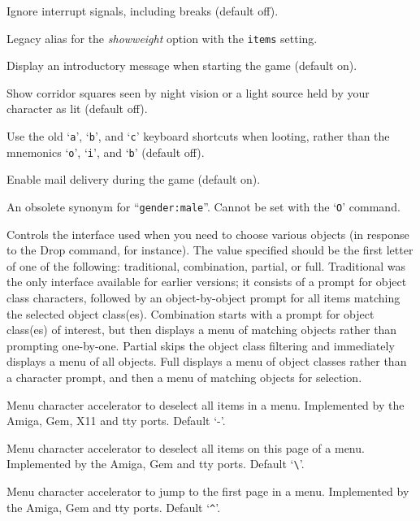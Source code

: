 \item[\ib{ignintr}]
Ignore interrupt signals, including breaks (default off).
\item[\ib{invweight}]
Legacy alias for the
{\it showweight\/}
option with the {\tt items} setting.
\item[\ib{legacy}]
Display an introductory message when starting the game (default on).
\item[\ib{lit\_corridor}]
Show corridor squares seen by night vision or a light source held by your
character as lit (default off).
\item[\ib{lootabc}]
Use the old `{\tt a}', `{\tt b}', and `{\tt c}' keyboard shortcuts when
looting, rather than the mnemonics `{\tt o}', `{\tt i}', and `{\tt b}' (default off).
\item[\ib{mail}]
Enable mail delivery during the game (default on).
\item[\ib{male}]
An obsolete synonym for ``{\tt gender:male}''.  Cannot be set with the
`{\tt O}' command.
\item[\ib{menustyle}]
Controls the interface used when you need to choose various objects (in
response to the Drop command, for instance).  The value specified should
be the first letter of one of the following:  traditional, combination,
partial, or full.  Traditional was the only interface available for
earlier versions; it consists of a prompt for object class characters,
followed by an object-by-object prompt for all items matching the selected
object class(es).  Combination starts with a prompt for object class(es)
of interest, but then displays a menu of matching objects rather than
prompting one-by-one.  Partial skips the object class filtering and
immediately displays a menu of all objects.  Full displays a menu of
object classes rather than a character prompt, and then a menu of matching
objects for selection.
\item[\ib{menu\_deselect\_all}]
Menu character accelerator to deselect all items in a menu.
Implemented by the Amiga, Gem, X11 and tty ports.
Default `-'.
\item[\ib{menu\_deselect\_page}]
Menu character accelerator to deselect all items on this page of a menu.
Implemented by the Amiga, Gem and tty ports.
Default `\verb+\+'.
\item[\ib{menu\_first\_page}]
Menu character accelerator to jump to the first page in a menu.
Implemented by the Amiga, Gem and tty ports.
Default `\verb+^+'.
\item[\ib{menu\_headings}]
